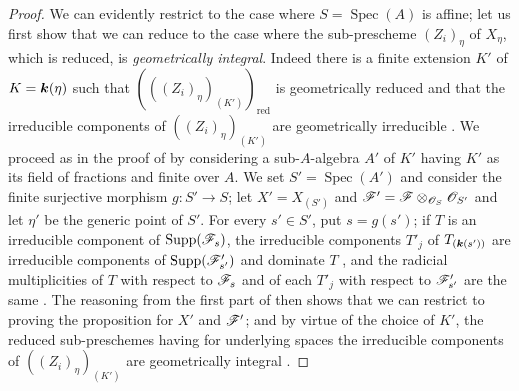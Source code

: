 \begin{proof}
\label{IV.9.8.6-proof}
We can evidently restrict to the case where $S=\operatorname{Spec}(A)$ is affine; let us first show that we can reduce to the case where the sub-prescheme $(Z_i)_\eta$ of $X_\eta$, which is reduced, is \emph{geometrically integral}.
Indeed there is a finite extension $K'$ of $K=\boldsymbol{k}(\eta)$ such that $(((Z_i)_\eta)_{(K')})_{\mathrm{red}}$ is geometrically reduced and that the irreducible components of $((Z_i)_\eta)_{(K')}$ are geometrically irreducible .
We proceed as in the proof of  by considering a sub-$A$-algebra $A'$ of $K'$ having $K'$ as its field of fractions and finite over $A$.
We set $S'=\operatorname{Spec}(A')$ and consider the finite surjective morphism $g:S'\to S$; let $X'=X_{(S')}$ and $\mathscr{F}'=\mathscr{F}\otimes_{\mathscr{O}_S}\mathscr{O}_{S'}$ and let $\eta'$ be the generic point of $S'$.
For every $s'\in S'$, put $s=g(s')$; if $T$ is an irreducible component of $\operatorname{Supp}(\mathscr{F}_s)$, the irreducible components $T'_j$ of $T_{(\boldsymbol{k}(s'))}$ are irreducible components of $\operatorname{Supp}(\mathscr{F}'_{s'})$ and dominate $T$ , and the radicial multiplicities of $T$ with respect to $\mathscr{F}_s$ and of each $T'_j$ with respect to $\mathscr{F}'_{s'}$ are the same .
The reasoning from the first part of  then shows that we can restrict to proving the proposition for $X'$ and $\mathscr{F}'$; and by virtue of the choice of $K'$, the reduced sub-preschemes having for underlying spaces the irreducible components of $((Z_i)_\eta)_{(K')}$ are geometrically integral .


\end{proof}
